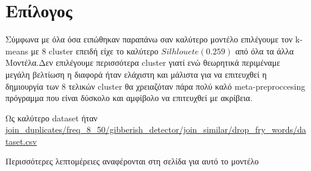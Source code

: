 \section{ Επίλογος}
Σύμφωνα με όλα όσα ειπώθηκαν παραπάνω σαν καλύτερο μοντέλο
επιλέγουμε τον k-means με 8 cluster επειδή είχε το 
καλύτερο $Silhlouete(0.259)$ από όλα τα άλλα Μοντέλα.Δεν επιλέγουμε περισσότερα
cluster γιατί ενώ θεωρητικά περιμέναμε μεγάλη βελτίωση η διαφορά ήταν ελάχιστη
και μάλιστα για να επιτευχθεί η δημιουργία των 8 τελικών cluster
θα χρειαζόταν πάρα πολύ καλό meta-preproccesing πρόγραμμα που είναι δύσκολο
και αμφίβολο να επιτευχθεί με ακρίβεια.

Ως καλύτερο dataset ήταν \url{join_duplicates/freq_8_50/gibberish_detector/join_similar/drop_fry_words/dataset.csv}

Περισσότερες λεπτομέρειες αναφέρονται στη σελίδα \pageref{Kmeans8} για αυτό το μοντέλο 
 
